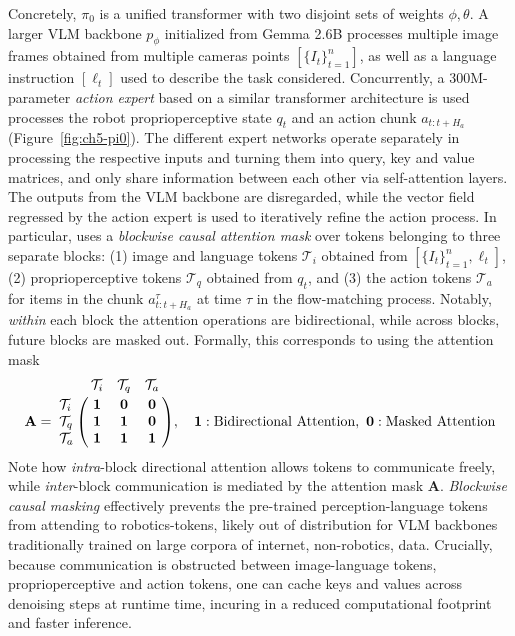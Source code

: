 Concretely, \( \pi_0 \) is a unified transformer with two disjoint sets of weights \( \phi, \theta\). 
A larger VLM backbone \( p_\phi \) initialized from Gemma 2.6B processes multiple image frames obtained from multiple cameras points \( [\{ I_t \}_{t=1}^n] \), as well as a language instruction \([\ell_t]\) used to describe the task considered.
Concurrently, a 300M-parameter \emph{action expert} based on a similar transformer architecture is used processes the robot proprioperceptive state \(q_t\) and an action chunk \(a_{t:t+H_a}\) (Figure~\ref{fig:ch5-pi0}).
The different expert networks operate separately in processing the respective inputs and turning them into query, key and value matrices, and only share information between each other via self-attention layers.
The outputs from the VLM backbone are disregarded, while the vector field regressed by the action expert is used to iteratively refine the action process.
In particular, \pizero uses a \emph{blockwise causal attention mask} over tokens belonging to three separate blocks: (1) image and language tokens \(\mathcal T_i \)  obtained from \([\{ I_t \}_{t=1}^n, \ell_t]\), (2) proprioperceptive tokens \(\mathcal T_q \) obtained from \(q_t\), and (3) the action tokens \( \mathcal T_a \) for items in the chunk \(a^{\tau}_{t:t+H_a}\) at time \( \tau \) in the flow-matching process.
Notably, \emph{within} each block the attention operations are bidirectional, while across blocks, future blocks are masked out.
Formally, this corresponds to using the attention mask 
\begin{equation*}
    \mathbf{A} =
    \bordermatrix{
              & \mathcal{T}_i & \mathcal{T}_q & \mathcal{T}_a \cr
    \mathcal{T}_i & \mathbf{1} & \mathbf{0} & \mathbf{0} \cr
    \mathcal{T}_q & \mathbf{1} & \mathbf{1} & \mathbf{0} \cr
    \mathcal{T}_a & \mathbf{1} & \mathbf{1} & \mathbf{1} \cr
    },
    \quad \mathbf{1}: \text{Bidirectional Attention}, \ \mathbf{0}: \text{Masked Attention} 
\end{equation*}
Note how \emph{intra}-block directional attention allows tokens to communicate freely, while \emph{inter}-block communication is mediated by the attention mask \(\mathbf{A} \).
\emph{Blockwise causal masking} effectively prevents the pre-trained perception-language tokens from attending to robotics-tokens, likely out of distribution for VLM backbones traditionally trained on large corpora of internet, non-robotics, data.
Crucially, because communication is obstructed between image-language tokens, proprioperceptive and action tokens, one can cache keys and values across denoising steps at runtime time, incuring in a reduced computational footprint and faster inference.

